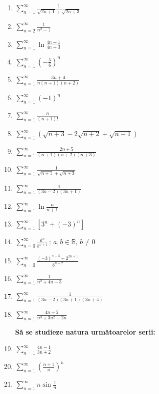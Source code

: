 \documentclass[12pt, a4paper]{report}
\begin{document}
	\begin{enumerate}[label=\textbf{\arabic*.}]
		\item $\displaystyle \sum_{n=1}^{\infty} \frac{1}{\sqrt{2n+1} + \sqrt{2n+3}} \quad$
		\item $\displaystyle \sum_{n=2}^{\infty} \frac{1}{n^2 - 1} \quad$
		\item $\displaystyle \sum_{n=1}^{\infty} \ln \frac{4n-1}{4n+3} \quad$
		\item $\displaystyle \sum_{n=1}^{\infty} \left(-\frac{5}{6}\right)^n \quad$
		\item $\displaystyle \sum_{n=1}^{\infty} \frac{3n+4}{n(n+1)(n+2)} \quad$
		\item $\displaystyle \sum_{n=1}^{\infty} (-1)^n \quad$
		\item $\displaystyle \sum_{n=1}^{\infty} \frac{n}{(n+1)!} \quad$
		\item $\displaystyle \sum_{n=1}^{\infty} \left(\sqrt{n+3} - 2\sqrt{n+2} + \sqrt{n+1}\right) \quad$
		\item $\displaystyle \sum_{n=1}^{\infty} \frac{2n+5}{(n+1)(n+2)(n+3)} \quad$
		\item $\displaystyle \sum_{n=1}^{\infty} \frac{1}{\sqrt{n+1} + \sqrt{n+3}} \quad$
		\item $\displaystyle \sum_{n=1}^{\infty} \frac{1}{(3n-2)(3n+1)} \quad$
		\item $\displaystyle \sum_{n=1}^{\infty} \ln \frac{n}{n+1} \quad$
		\item $\displaystyle \sum_{n=1}^{\infty} \left[3^n + (-3)^n\right] \quad$
		\item $\displaystyle \sum_{n=0}^{\infty} \frac{a^n}{b^{n+1}} \,;\, a,b \in \mathbb{R}, \, b \neq 0 \quad $
		\item $\displaystyle \sum_{n=0}^{\infty} \frac{(-3)^{n+3} + 2^{2n+1}}{8^{n+2}} \quad$
		\item $\displaystyle \sum_{n=1}^{\infty} \frac{1}{n^2 + 4n + 3} \quad$
		\item $\displaystyle \sum_{n=1}^{\infty} \frac{1}{(3n-2)(3n+1)(3n+4)} \quad$
		\item $\displaystyle \sum_{n=1}^{\infty} \frac{4n+2}{n^3 + 3n^2 + 2n} \quad$
		
		\bigskip
		\hspace*{-0.6cm}\textbf{Să se studieze natura următoarelor serii:}
		\vspace{0.2cm}
		
		\item $\displaystyle \sum_{n=1}^{\infty} \frac{4n-1}{3n+2} \quad$
		\item $\displaystyle \sum_{n=1}^{\infty} \left(\frac{n+1}{n}\right)^n \quad$
		\item $\displaystyle \sum_{n=1}^{\infty} n \sin \frac{1}{n} \quad$
	\end{enumerate}
	
\end{document}
